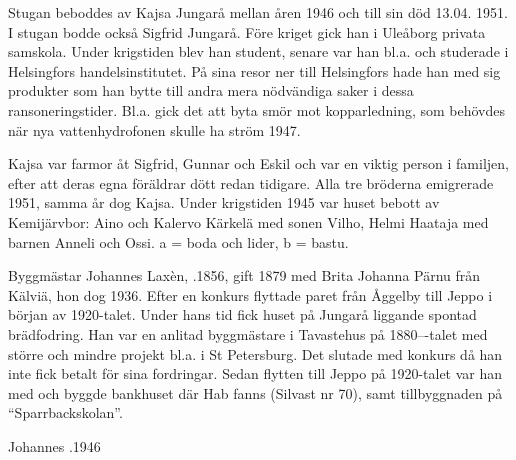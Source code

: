 
Stugan  beboddes av Kajsa Jungarå mellan åren 1946 och till sin död 13.04. 1951. I stugan bodde också Sigfrid Jungarå. Före kriget gick han i Uleåborg privata samskola. Under krigstiden blev han student, senare var han bl.a. och studerade i Helsingfors handelsinstitutet. På sina resor ner till Helsingfors hade han med sig produkter som han bytte till andra mera nödvändiga saker i dessa ransoneringstider. Bl.a. gick det att byta smör mot kopparledning, som behövdes när nya vattenhydrofonen skulle ha ström 1947.

Kajsa var farmor åt Sigfrid, Gunnar och Eskil och var en viktig person i familjen, efter att deras egna föräldrar dött redan tidigare. Alla tre bröderna emigrerade 1951, samma år dog Kajsa. Under 	krigstiden 1945 var huset bebott av Kemijärvbor: Aino och Kalervo Kärkelä med sonen Vilho, Helmi Haataja med barnen Anneli och Ossi. a = boda och lider, b = bastu.


Byggmästar Johannes Laxèn, .1856, gift 1879 med Brita Johanna Pärnu från Kälviä, hon dog 1936. Efter en konkurs flyttade paret från Åggelby till Jeppo i början av 1920-talet. Under hans tid fick huset på Jungarå liggande spontad brädfodring. Han var en anlitad byggmästare i Tavastehus på 1880---talet med större och mindre projekt bl.a. i St Petersburg. Det slutade med konkurs då han inte fick betalt för sina fordringar. Sedan flytten till Jeppo på 1920-talet var han med och byggde bankhuset där Hab fanns (Silvast nr 70), samt tillbyggnaden på ``Sparrbackskolan''.

Johannes .1946


